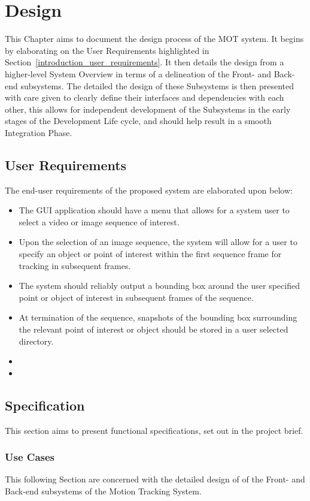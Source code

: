 \chapter{Design}\label{chapter_design}
This Chapter aims to document the design process of the MOT system. It begins by
elaborating on the User Requirements highlighted in
Section~\ref{introduction_user_requirements}. It then details the design from a
higher-level System Overview in terms of a delineation of the Front- and
Back-end subsystems.
The detailed the design of these Subsystems is then presented with care given to
clearly define their interfaces and dependencies with each other, this allows for
independent development of the Subsystems in the early stages of the Development
Life cycle, and should help result in a smooth Integration Phase.

\section{User Requirements}
The end-user requirements of the proposed system are elaborated upon below:
\begin{itemize}
    \item The GUI application should have a menu that allows for a system
        user to select a video or image sequence of interest.
    \item Upon the selection of an image sequence, the system will allow for a
        user to specify an object or point of interest within the first sequence
        frame for tracking in subsequent frames.
    \item The system should reliably output a bounding box around the user
        specified point or object of interest in subsequent frames of the
        sequence. 
    \item At termination of the sequence, snapshots of the bounding box
        surrounding the relevant point of interest or object should be stored in
        a user selected directory.
    \item
    \item
\end{itemize}

\section{Specification}
This section aims to present functional specifications, set out in the
project brief.

\subsection{Use Cases}
This following Section are concerned with the detailed design of of the Front- and Back-end
subsystems of the Motion Tracking System.

